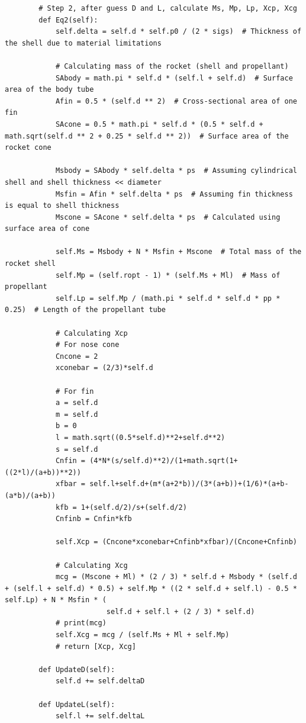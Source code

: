 \documentclass{report}
\begin{document}
\begin{lstlisting}
        # Step 2, after guess D and L, calculate Ms, Mp, Lp, Xcp, Xcg
        def Eq2(self):
            self.delta = self.d * self.p0 / (2 * sigs)  # Thickness of the shell due to material limitations

            # Calculating mass of the rocket (shell and propellant)
            SAbody = math.pi * self.d * (self.l + self.d)  # Surface area of the body tube
            Afin = 0.5 * (self.d ** 2)  # Cross-sectional area of one fin
            SAcone = 0.5 * math.pi * self.d * (0.5 * self.d + math.sqrt(self.d ** 2 + 0.25 * self.d ** 2))  # Surface area of the rocket cone

            Msbody = SAbody * self.delta * ps  # Assuming cylindrical shell and shell thickness << diameter
            Msfin = Afin * self.delta * ps  # Assuming fin thickness is equal to shell thickness
            Mscone = SAcone * self.delta * ps  # Calculated using surface area of cone

            self.Ms = Msbody + N * Msfin + Mscone  # Total mass of the rocket shell
            self.Mp = (self.ropt - 1) * (self.Ms + Ml)  # Mass of propellant
            self.Lp = self.Mp / (math.pi * self.d * self.d * pp * 0.25)  # Length of the propellant tube

            # Calculating Xcp
            # For nose cone
            Cncone = 2
            xconebar = (2/3)*self.d

            # For fin
            a = self.d
            m = self.d
            b = 0
            l = math.sqrt((0.5*self.d)**2+self.d**2)
            s = self.d
            Cnfin = (4*N*(s/self.d)**2)/(1+math.sqrt(1+((2*l)/(a+b))**2))
            xfbar = self.l+self.d+(m*(a+2*b))/(3*(a+b))+(1/6)*(a+b-(a*b)/(a+b))
            kfb = 1+(self.d/2)/s+(self.d/2)
            Cnfinb = Cnfin*kfb

            self.Xcp = (Cncone*xconebar+Cnfinb*xfbar)/(Cncone+Cnfinb)

            # Calculating Xcg
            mcg = (Mscone + Ml) * (2 / 3) * self.d + Msbody * (self.d + (self.l + self.d) * 0.5) + self.Mp * ((2 * self.d + self.l) - 0.5 * self.Lp) + N * Msfin * (
                        self.d + self.l + (2 / 3) * self.d)
            # print(mcg)
            self.Xcg = mcg / (self.Ms + Ml + self.Mp)
            # return [Xcp, Xcg]

        def UpdateD(self):
            self.d += self.deltaD

        def UpdateL(self):
            self.l += self.deltaL


\end{lstlisting}
\end{document}

